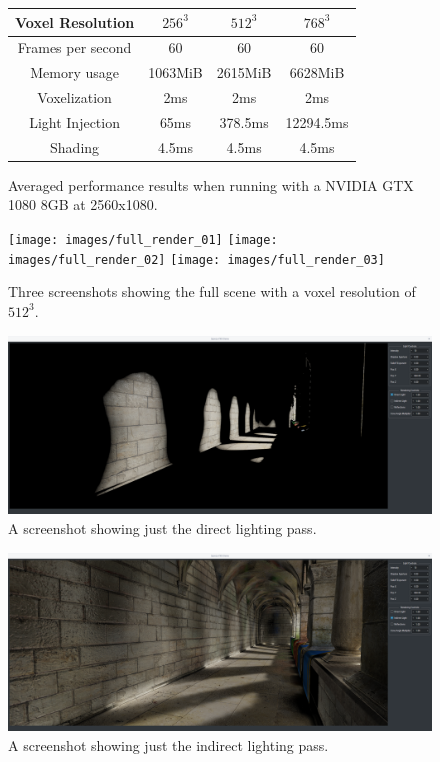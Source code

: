 \documentclass[]{acmsiggraph}
\begin{document}
\begin{figure}[htbp]\centering
\begin{center}
 \begin{tabular}{|c|c|c|c|}
 \hline
 Voxel Resolution & $256^3$ & $512^3$ & $768^3$ \\
 \hline
 \hline
 Frames per second & 60 & 60 & 60 \\
 \hline
 Memory usage & 1063MiB & 2615MiB & 6628MiB \\
 \hline
 Voxelization & 2ms & 2ms & 2ms \\
 \hline
 Light Injection & 65ms & 378.5ms & 12294.5ms\\
 \hline
 Shading & 4.5ms & 4.5ms & 4.5ms \\
 \hline
 \end{tabular}
 \caption{\label{figure:performance} Averaged performance results when running with a NVIDIA GTX 1080 8GB at 2560x1080.}
\end{center}
\end{figure}

\begin{figure}[htbp]\centering
 \texttt{[image: images/full\_render\_01]}
 \texttt{[image: images/full\_render\_02]}
 \texttt{[image: images/full\_render\_03]}
 \caption{\label{figure:fullrender}Three screenshots showing the full scene with a voxel resolution of $512^3$.}
\end{figure}

\begin{figure}[htbp]\centering
 \includegraphics[width=1.0\linewidth]{images/direct_only}
 \caption{A screenshot showing just the direct lighting pass.}
\end{figure}

\begin{figure}[htbp]\centering
 \includegraphics[width=1.0\linewidth]{images/indirect_only}
 \caption{A screenshot showing just the indirect lighting pass.}
\end{figure}
\end{document}
